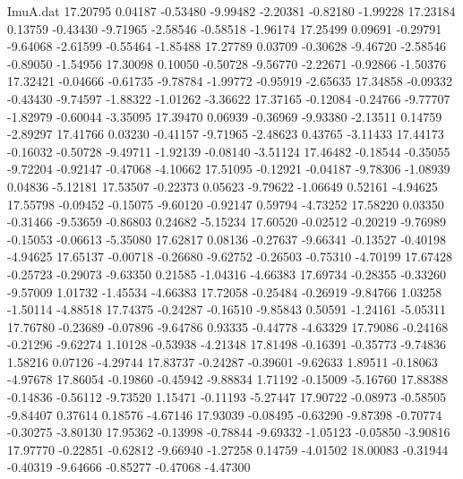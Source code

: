 \begin{filecontents}{ImuA.dat}
  17.20795    0.04187   -0.53480   -9.99482   -2.20381   -0.82180   -1.99228
  17.23184    0.13759   -0.43430   -9.71965   -2.58546   -0.58518   -1.96174
  17.25499    0.09691   -0.29791   -9.64068   -2.61599   -0.55464   -1.85488
  17.27789    0.03709   -0.30628   -9.46720   -2.58546   -0.89050   -1.54956
  17.30098    0.10050   -0.50728   -9.56770   -2.22671   -0.92866   -1.50376
  17.32421   -0.04666   -0.61735   -9.78784   -1.99772   -0.95919   -2.65635
  17.34858   -0.09332   -0.43430   -9.74597   -1.88322   -1.01262   -3.36622
  17.37165   -0.12084   -0.24766   -9.77707   -1.82979   -0.60044   -3.35095
  17.39470    0.06939   -0.36969   -9.93380   -2.13511    0.14759   -2.89297
  17.41766    0.03230   -0.41157   -9.71965   -2.48623    0.43765   -3.11433
  17.44173   -0.16032   -0.50728   -9.49711   -1.92139   -0.08140   -3.51124
  17.46482   -0.18544   -0.35055   -9.72204   -0.92147   -0.47068   -4.10662
  17.51095   -0.12921   -0.04187   -9.78306   -1.08939    0.04836   -5.12181
  17.53507   -0.22373    0.05623   -9.79622   -1.06649    0.52161   -4.94625
  17.55798   -0.09452   -0.15075   -9.60120   -0.92147    0.59794   -4.73252
  17.58220    0.03350   -0.31466   -9.53659   -0.86803    0.24682   -5.15234
  17.60520   -0.02512   -0.20219   -9.76989   -0.15053   -0.06613   -5.35080
  17.62817    0.08136   -0.27637   -9.66341   -0.13527   -0.40198   -4.94625
  17.65137   -0.00718   -0.26680   -9.62752   -0.26503   -0.75310   -4.70199
  17.67428   -0.25723   -0.29073   -9.63350    0.21585   -1.04316   -4.66383
  17.69734   -0.28355   -0.33260   -9.57009    1.01732   -1.45534   -4.66383
  17.72058   -0.25484   -0.26919   -9.84766    1.03258   -1.50114   -4.88518
  17.74375   -0.24287   -0.16510   -9.85843    0.50591   -1.24161   -5.05311
  17.76780   -0.23689   -0.07896   -9.64786    0.93335   -0.44778   -4.63329
  17.79086   -0.24168   -0.21296   -9.62274    1.10128   -0.53938   -4.21348
  17.81498   -0.16391   -0.35773   -9.74836    1.58216    0.07126   -4.29744
  17.83737   -0.24287   -0.39601   -9.62633    1.89511   -0.18063   -4.97678
  17.86054   -0.19860   -0.45942   -9.88834    1.71192   -0.15009   -5.16760
  17.88388   -0.14836   -0.56112   -9.73520    1.15471   -0.11193   -5.27447
  17.90722   -0.08973   -0.58505   -9.84407    0.37614    0.18576   -4.67146
  17.93039   -0.08495   -0.63290   -9.87398   -0.70774   -0.30275   -3.80130
  17.95362   -0.13998   -0.78844   -9.69332   -1.05123   -0.05850   -3.90816
  17.97770   -0.22851   -0.62812   -9.66940   -1.27258    0.14759   -4.01502
  18.00083   -0.31944   -0.40319   -9.64666   -0.85277   -0.47068   -4.47300

\end{filecontents}
